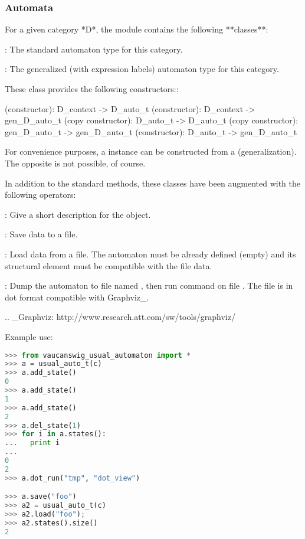 \subsubsection{Automata}

For  a  given  category  *D*,  the  module  
contains the following **classes**:

:
  The standard automaton type for this category.

:
  The  generalized (with  expression labels)  automaton type  for this
  category.

These class provides the following constructors::

  (constructor): D\_context -> D\_auto\_t
  (constructor): D\_context -> gen\_D\_auto\_t
  (copy constructor): D\_auto\_t -> D\_auto\_t
  (copy constructor): gen\_D\_auto\_t -> gen\_D\_auto\_t
  (constructor): D\_auto\_t -> gen\_D\_auto\_t

For   convenience  purposes,  a     instance   can  be
constructed from a   (generalization). The opposite is not
possible, of course.

In addition to the standard \Vauc methods, these classes have been
augmented with the following operators:

:
   Give a short description for the object.

:
   Save data to a file.

:
   Load data from a file. The automaton must be already defined (empty)
   and its structural element must be compatible with the file data.

:
   Dump the automaton to file named , then run command 
   on file . The file is in dot format compatible with Graphviz\_.

.. \_Graphviz: http://www.research.att.com/sw/tools/graphviz/

Example use:

\begin{lstlisting}[language=Python]
>>> from vaucanswig_usual_automaton import *
>>> a = usual_auto_t(c)
>>> a.add_state()
0
>>> a.add_state()
1
>>> a.add_state()
2
>>> a.del_state(1)
>>> for i in a.states():
...   print i
...
0
2
>>> a.dot_run("tmp", "dot_view")

>>> a.save("foo")
>>> a2 = usual_auto_t(c)
>>> a2.load("foo");
>>> a2.states().size()
2
\end{lstlisting}



